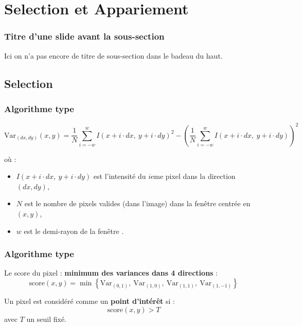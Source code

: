 \section[Selection et Appariement]{Selection et Appariement}
\begin{frame}
\frametitle{Titre d'une slide avant la sous-section\esp}
	Ici on n'a pas encore de titre de sous-section dans le badeau du haut.
	\label{slides_hors_subsec}
\end{frame}


\subsection{Selection}
\begin{frame}
\frametitle{Algorithme type }
\[
\mathrm{Var}_{(dx, dy)}(x, y) = \frac{1}{N} \sum_{i=-w}^{w} I(x + i \cdot dx,\ y + i \cdot dy)^2 - \left( \frac{1}{N} \sum_{i=-w}^{w} I(x + i \cdot dx,\ y + i \cdot dy) \right)^2
\]

où :
\begin{itemize}
  \item $I(x + i \cdot dx,\ y + i \cdot dy)$ est l’intensité du $i$eme pixel dans la direction $(dx, dy)$,
  \item $N$ est le nombre de pixels valides (dans l’image) dans la fenêtre centrée en $(x, y)$,
  \item $w$ est le demi-rayon de la fenêtre .
\end{itemize}
\end{frame}
\begin{frame}
\frametitle{Algorithme type }

\vspace{0.5em}
Le score du pixel : \textbf{minimum des variances dans 4 directions} :
\[
\text{score}(x, y) = \min \left\{ \mathrm{Var}_{(0,1)},\ \mathrm{Var}_{(1,0)},\ \mathrm{Var}_{(1,1)},\ \mathrm{Var}_{(1,-1)} \right\}
\]

Un pixel est considéré comme un \textbf{point d’intérêt} si :
\[
\text{score}(x, y) > T
\]
avec $T$ un seuil fixé.
\end{frame}


